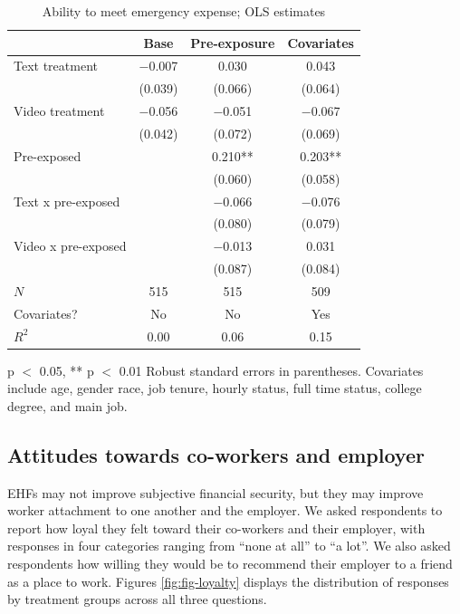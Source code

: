 \documentclass[
  11pt,
  oneside]{article}
\begin{document}
\begin{table}
\centering
\caption{\label{tab:tab-finsec}Ability to meet emergency expense; OLS estimates \label{tab:tab-finsec}}
\centering
\begin{threeparttable}
\begin{tabular}[t]{lccc}
\toprule
  & Base & Pre-exposure & Covariates\\
\midrule
Text treatment & \num{-0.007} & \num{0.030} & \num{0.043}\\
 & (\num{0.039}) & (\num{0.066}) & (\num{0.064})\\
Video treatment & \num{-0.056} & \num{-0.051} & \num{-0.067}\\
 & (\num{0.042}) & (\num{0.072}) & (\num{0.069})\\
Pre-exposed &  & \num{0.210}** & \num{0.203}**\\
 &  & (\num{0.060}) & (\num{0.058})\\
Text x pre-exposed &  & \num{-0.066} & \num{-0.076}\\
 &  & (\num{0.080}) & (\num{0.079})\\
Video x pre-exposed &  & \num{-0.013} & \num{0.031}\\
 &  & (\num{0.087}) & (\num{0.084})\\
\midrule
$N$ & \num{515} & \num{515} & \num{509}\\
Covariates? & No & No & Yes\\
$R^2$ & \num{0.00} & \num{0.06} & \num{0.15}\\
\bottomrule
\end{tabular}
\begin{tablenotes}
\item * p $<$ 0.05, ** p $<$ 0.01 Robust standard errors in parentheses. Covariates include age, gender race, job tenure, hourly status, full time status, college degree, and main job.
\end{tablenotes}
\end{threeparttable}
\end{table}

\subsection{Attitudes towards co-workers and employer}\label{attitudes-towards-co-workers-and-employer}

EHFs may not improve subjective financial security, but they may improve worker attachment to one another and the employer. We asked respondents to report how loyal they felt toward their co-workers and their employer, with responses in four categories ranging from ``none at all'' to ``a lot''. We also asked respondents how willing they would be to recommend their employer to a friend as a place to work. Figures \ref{fig:fig-loyalty} displays the distribution of responses by treatment groups across all three questions.
\end{document}
